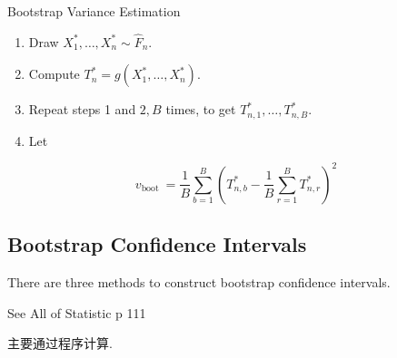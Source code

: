 Bootstrap Variance Estimation

\begin{enumerate}
	\item Draw $X_1^*, \ldots, X_n^* \sim \widehat{F}_n$.
	\item Compute $T_n^*=g\left(X_1^*, \ldots, X_n^*\right)$.
	\item Repeat steps 1 and $2, B$ times, to get $T_{n, 1}^*, \ldots, T_{n, B}^*$.
	\item Let
\end{enumerate}
\[
v_{\text {boot }}=\frac{1}{B} \sum_{b=1}^B\left(T_{n, b}^*-\frac{1}{B} \sum_{r=1}^B T_{n, r}^*\right)^2
\]
\subsection{Bootstrap Confidence Intervals}

There are three methods to construct bootstrap confidence intervals.

See All of Statistic p 111

\begin{note}
主要通过程序计算.
\end{note}